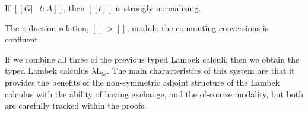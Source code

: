 \documentclass{llncs}
\begin{document}
\iffalse
\begin{lemma}[Type Preserving Embedding]
  \label{lemma:type_preserving_embedding_lambdaLk}
  If $[[G |- t : A]]$ in $\lambda\text{L}_!$, then
  $[[G e |- t e : h(A e)]]$ in ILL.
\end{lemma}
\begin{proof}
  This holds by straightforward induction on the form of the assumed
  typing derivation.
\end{proof}
\begin{lemma}[Reduction Preserving Embedding]
  \label{lemma:reduction_preserving_embedding_lambdaLk}
  If $[[t1 ~> t2]]$ in $\lambda\text{L}_!$, then $[[t1 e ~> h{t2 e}]]$
  in ILL.
\end{lemma}
\begin{proof}
  This holds by straightforward induction on the form of the assumed
  reduction derivation.
\end{proof}
\noindent
Finally, we can use the previous two results to conclude strong
normalization, because ILL is.
\fi 

\begin{theorem}
  \label{corollary:strong_normalization_lambdaLk}
  If $[[G |- t : A]]$, then $[[t]]$ is strongly normalizing.
\end{theorem}



\begin{theorem}[Confluence]
  \label{thm:confluence-lambdaLk}
  The reduction relation, $[[~>]]$, modulo the commuting conversions
  is confluent.
\end{theorem}
\fi 


\label{subsec:the_typed_lambek_calculus:lambda-l-!kappa}
If we combine all three of the previous typed Lambek calculi, then we
obtain the typed Lambek calculus $\lambda\text{L}_{!\kappa}$.  
The main characteristics of this system are that it
provides the benefits of the non-symmetric adjoint structure of the Lambek calculus with the ability  of
having exchange, and the of-course modality, but both are carefully
tracked within the proofs.
\end{document}

